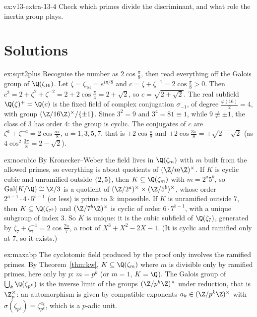 \begin{hint}{ex:v13-extra-13-4}
Check which primes divide the discriminant, and what role the inertia group plays.
\end{hint}

\section{Solutions}

\begin{solution}{ex:sqrt2plus}
\idea Recognise the number as $2\cos\frac{\pi}{8}$, then read everything off the Galois group of $\Q(\zeta_{16})$.
\writeup Let $\zeta=\zeta_{16}=e^{i\pi/8}$ and $c=\zeta+\zeta^{-1}=2\cos\frac\pi8>0$. Then $c^2=2+\zeta^2+\zeta^{-2}=2+2\cos\frac\pi4=2+\sqrt2$, so $c=\sqrt{2+\sqrt2}$.
The real subfield $\Q(\zeta)^+=\Q(c)$ is the fixed field of complex conjugation $\sigma_{-1}$, of degree $\frac{\varphi(16)}2=4$, with group
$(\Z/16\Z)^\times/\{\pm1\}$. Since $3^2=9$ and $3^4=81\equiv1$, while $9\not\equiv\pm1$, the class of $3$ has order $4$: the group is cyclic. The conjugates of $c$
are $\zeta^a+\zeta^{-a}=2\cos\frac{a\pi}8$, $a=1,3,5,7$, that is $\pm2\cos\frac\pi8$ and $\pm2\cos\frac{3\pi}8=\pm\sqrt{2-\sqrt2}$ (as $4\cos^2\frac{3\pi}8=2-\sqrt2$).
\end{solution}

\begin{solution}{ex:nocubic}
\idea By Kronecker--Weber the field lives in $\Q(\zeta_m)$ with $m$ built from the allowed primes, so everything is about quotients of $(\Z/m\Z)^\times$.
\writeup If $K$ is cyclic cubic and unramified outside $\{2,5\}$, then $K\subseteq\Q(\zeta_m)$ with $m=2^a5^b$, so $\operatorname{Gal}(K/\Q)\cong\Z/3$ is a quotient of
$(\Z/2^a)^\times\times(\Z/5^b)^\times$, whose order $2^{a-1}\cdot4\cdot5^{b-1}$ (or less) is prime to $3$: impossible. If $K$ is unramified outside $7$, then
$K\subseteq\Q(\zeta_{7^b})$ and $(\Z/7^b\Z)^\times$ is cyclic of order $6\cdot7^{b-1}$, with a unique subgroup of index $3$. So $K$ is unique: it is the cubic
subfield of $\Q(\zeta_7)$, generated by $\zeta_7+\zeta_7^{-1}=2\cos\frac{2\pi}7$, a root of $X^3+X^2-2X-1$. (It is cyclic and ramified only at $7$, so it exists.)
\end{solution}

\begin{solution}{ex:maxabp}
\idea The cyclotomic field produced by the proof only involves the ramified primes.
\writeup By Theorem~\ref{thm:kw}, $K\subseteq\Q(\zeta_m)$ where $m$ is divisible only by ramified primes, here only by $p$: $m=p^k$ (or $m=1$, $K=\Q$). The Galois
group of $\bigcup_k\Q(\zeta_{p^k})$ is the inverse limit of the groups $(\Z/p^k\Z)^\times$ under reduction, that is $\Z_p^\times$: an automorphism is given by
compatible exponents $a_k\in(\Z/p^k\Z)^\times$ with $\sigma(\zeta_{p^k})=\zeta_{p^k}^{a_k}$, which is a $p$-adic unit.
\end{solution}

